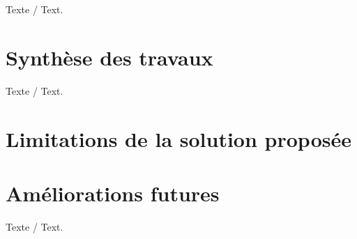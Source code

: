 \label{sec:Conclusion}
Texte / Text.

\section{Synthèse des travaux}
Texte / Text.

\section{Limitations de la solution proposée}\label{sec:Limitations}

\section{Améliorations futures}
Texte / Text.

\todos

